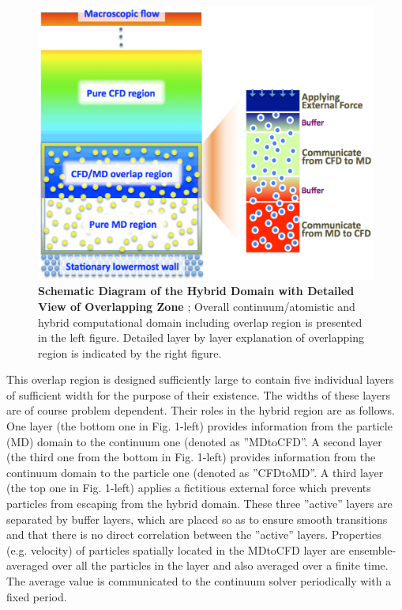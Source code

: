 \documentclass[preprint,12pt]{elsarticle}
\begin{document}
\begin{figure}
\centering
\includegraphics[width=0.8\linewidth]{Hybrid_Schematic.pdf}
\vskip-0.2cm
\caption{\small 
{\bf Schematic Diagram of the Hybrid Domain with Detailed View of Overlapping Zone}
; Overall continuum/atomistic and hybrid computational domain including 
overlap region is presented in the left figure. Detailed layer by layer 
explanation of overlapping region is indicated by the right figure.
}
\label{Fig:Couette}
\vspace{-1em}
\end{figure}


This overlap region is designed sufficiently large to contain five individual layers of sufficient width for the purpose of their existence. The widths of these layers are of course problem dependent. Their roles in the hybrid region are as follows. One layer (the bottom one in Fig. 1-left) provides information from the particle (MD) domain to the continuum one (denoted as ''MDtoCFD''. A second layer (the third one from the bottom in Fig. 1-left) provides information from the continuum domain to the particle one (denoted as ''CFDtoMD''. A third layer (the top one in Fig. 1-left) applies a fictitious external force which prevents particles from escaping from the hybrid domain. These three ''active'' layers are separated by buffer layers, which are placed so as to ensure smooth transitions and that there is no direct correlation between the ''active'' layers. Properties (e.g. velocity) of particles spatially located in the MDtoCFD layer are ensemble-averaged over all the particles in the layer and also averaged over a finite time. The average value is communicated to the continuum solver periodically with a fixed period.
\end{document}
